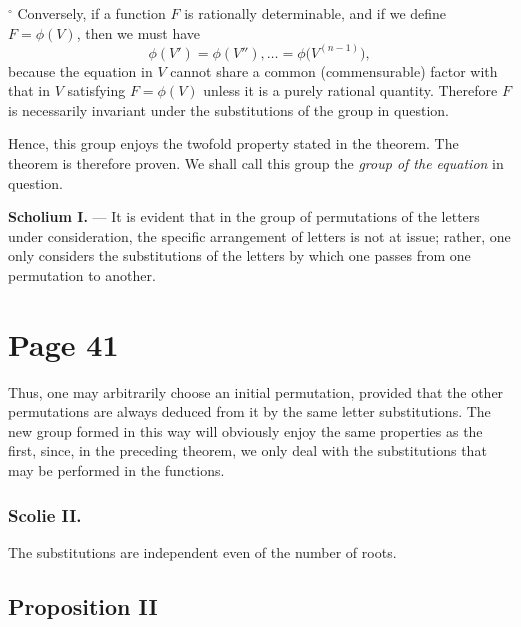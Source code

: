 \documentclass{article}
\begin{document}
\smallskip

\(^\circ\) Conversely, if a function \(F\) is rationally determinable, and if we define \(F = \phi(V)\), then we must have
\[
\phi(V') = \phi(V''), \dots = \phi\bigl(V^{(n-1)}\bigr),
\]
because the equation in \(V\) cannot share a common (commensurable) factor with that in \(V\) satisfying \(F = \phi(V)\) unless it is a purely rational quantity. Therefore \(F\) is necessarily invariant under the substitutions of the group in question.

\smallskip

\noindent
Hence, this group enjoys the twofold property stated in the theorem. The theorem is therefore proven. We shall call this group the \emph{group of the equation} in question.

\medskip

\noindent
\textbf{Scholium I.} --- It is evident that in the group of permutations of the letters under consideration, the specific arrangement of letters is not at issue; rather, one only considers the substitutions of the letters by which one passes from one permutation to another.



\section*{Page 41}

Thus, one may arbitrarily choose an initial permutation, provided that the other permutations are always deduced from it by the same letter substitutions. The new group formed in this way will obviously enjoy the same properties as the first, since, in the preceding theorem, we only deal with the substitutions that may be performed in the functions.

\subsubsection*{Scolie II.}
The substitutions are independent even of the number of roots.

\subsection*{Proposition II}
\end{document}
